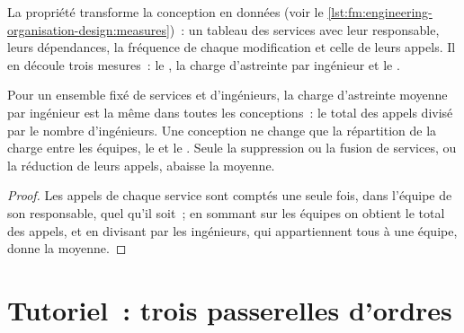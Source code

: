 La propriété transforme la conception en données (voir le \cref{lst:fm:engineering-organisation-design:measures})~: un tableau des services avec leur responsable, leurs
dépendances, la fréquence de chaque modification et celle de leurs appels. Il en découle trois mesures~: le , la charge d'astreinte
par ingénieur et le .

\label{lst:fm:engineering-organisation-design:measures}

\begin{proposition}\label{prop:fm:engineering-organisation-design:load}
Pour un ensemble fixé de services et d'ingénieurs, la charge d'astreinte moyenne par ingénieur est la même dans toutes les conceptions~: le total des appels divisé par le nombre d'ingénieurs. Une
conception ne change que la répartition de la charge entre les équipes, le  et le . Seule la suppression ou la fusion de services, ou
la réduction de leurs appels, abaisse la moyenne.
\end{proposition}

\begin{proof}
Les appels de chaque service sont comptés une seule fois, dans l'équipe de son responsable, quel qu'il soit~; en sommant sur les équipes on obtient le total des appels, et en divisant par les
ingénieurs, qui appartiennent tous à une équipe, donne la moyenne.
\end{proof}

\section{Tutoriel~: trois passerelles d'ordres}\label{tut:fm:engineering-organisation-design:tut}

